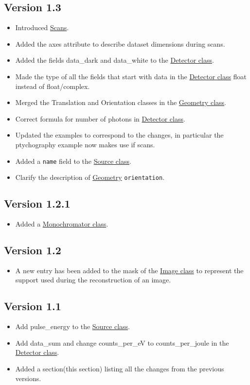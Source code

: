 \documentclass[usletter,11pt]{article}
\begin{document}
\subsection{Version 1.3}
\begin{itemize}
\item{Introduced \hyperref[sec:scans]{Scans}.}
\item{Added the axes attribute to describe dataset dimensions during
    scans.}
\item{Added the fields data\_dark and data\_white to the
   \hyperref[table:detector]{Detector class}.}
\item{Made the type of all the fields that start with data in the
   \hyperref[table:detector]{Detector class} float instead of
   float/complex.}
\item{Merged the Translation and Orientation classes in the
    \hyperref[table:geometry]{Geometry class}.}
\item{Correct formula for number of photons in
    \hyperref[table:detector]{Detector class}.}
\item{Updated the examples to correspond to the changes, in particular
   the ptychography example now makes use if scans.}
\item{Added a {\tt name} field to the
   \hyperref[table:source]{Source class}.}
\item{Clarify the description of \hyperref[table:geometry]{Geometry}
    {\tt orientation}.}
\end{itemize}
\subsection{Version 1.2.1}
\begin{itemize}
\item{Added a \hyperref[table:monochromator]{Monochromator class}.}
\end{itemize}
\subsection{Version 1.2}
\begin{itemize}
\item{A new entry has been added to the mask of the \hyperref[table:image]{Image class}
to represent the support used during the reconstruction of an image.}
\end{itemize}
\subsection{Version 1.1}
\begin{itemize}
\item{Add pulse\_energy to the \hyperref[table:source]{Source class}.}
\item{Add data\_sum and change counts\_per\_eV to counts\_per\_joule in the \hyperref[table:detector]{Detector class}.}
\item{Added a section(this section) listing all the changes from the
   previous versions.}
\end{itemize}
\end{document}
